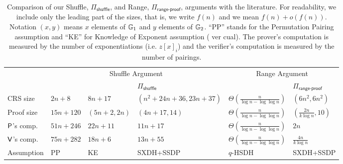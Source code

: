 
\begin{table}[h]
\begin{center}
\begin{minipage}{\textwidth}
\begin{center}
\begin{scriptsize}
\begin{tabular}{|l|lll|ll|}
\hline
                                                   & \multicolumn{3}{c|}{Shuffle Argument} & \multicolumn{2}{c|}{Range Argument} \\
                                                   & \cite{AC:GroLu07}          & \cite{EPRINT:FauLip15} & $\Pi_\mathsf{shuffle}$
                                                   & \cite{PAIRING:RiaKohPre09} & $\Pi_{\mathsf{range}\mbox{-}\mathsf{proof}}$ 
\\ \hline\hline
\rule{0pt}{2.5ex}CRS size                          & $2n + 8$                   & $8n + 17$              & $(n^2+24n+36,23n+37)$                
                                                   & $\Theta(\frac{n}{\log n-\log\log n})$ & $(6n^2,6n^2)$ \\
\rule{0pt}{2.5ex}Proof size                        & $15n + 120$                & $(5n+2,2n)$            & $(4n+17,14)$
                                                   & $\Theta(\frac{n}{\log n-\log\log n})$ & $(\frac{2n}{k\log n},10)$ \\
\rule{0pt}{2.5ex}$\mathsf{P}$'s comp.                   & $51n + 246$                & $22n + 11$             & $11n+17$
                                                   & $\Theta(\frac{n}{\log n-\log\log n})$ & $2n$ \\
\rule{0pt}{2.5ex}$\mathsf{V}$'s comp.                   & $75n + 282$                & $18n + 6$              & $13n+55$
                                                   & $\Theta(\frac{n}{\log n-\log\log n})$ & $\frac{4n}{k\log n}$ \\
\rule{0pt}{2.5ex}Assumption                        & PP                         & KE                     & SXDH+SSDP
                                                   & $q$-HSDH                   & SXDH+SSDP \\\hline 
\end{tabular}
\end{scriptsize}
\end{center}
\caption{Comparison of our Shuffle, $\Pi_\mathsf{shuffle}$, and Range, $\Pi_{\mathsf{range}\mbox{-}\mathsf{proof}}$, arguments with the literature. For readability, we include only the leading part of the sizes, that is, we write $f(n)$ and we mean $f(n)+o(f(n))$. Notation $(x,y)$ means $x$ elements of $\mathbb{G}_1$ and $y$ elements of $\mathbb{G}_2$. ``PP'' stands for the Permutation Pairing assumption and ``KE'' for Knowledge of Exponent assumption ({\color{red} ver cual}). The prover's computation is measured by the number of exponentiations (i.e. $z[x]_i$) and the verifier's computation is measured by the number of pairings.\label{table:eff}  } 
\end{minipage}
\vspace{-0.54cm}

\end{center}
\end{table}
